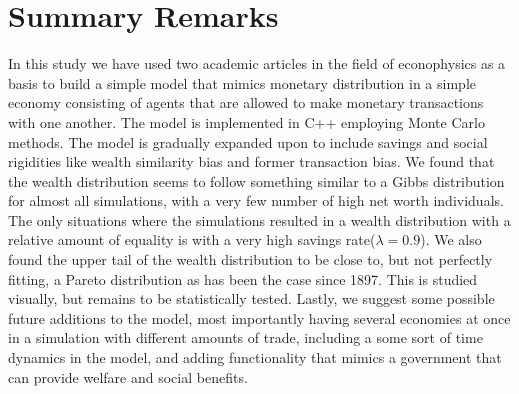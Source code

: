 \documentclass[10pt, a4paper]{amsart}
\begin{document}
\section{Summary Remarks}
In this study we have used two academic articles in the field of econophysics\cite{Patriarca}\cite{GoswamiSen} as a basis to build a simple model that mimics monetary distribution in a simple economy consisting of agents that are allowed to make monetary transactions with one another. The model is implemented in C++ employing Monte Carlo methods. The model is gradually expanded upon to include savings and social rigidities like wealth similarity bias and former transaction bias. We found that the wealth distribution seems to follow something similar to a Gibbs distribution for almost all simulations, with a very few number of high net worth individuals. The only situations where the simulations resulted in a wealth distribution with a relative amount of equality is with a very high savings rate($\lambda=0.9$). We also found the upper tail of the wealth distribution to be close to, but not perfectly fitting, a Pareto distribution as has been the case since 1897\cite{Pareto}. This is studied visually, but remains to be statistically tested. Lastly, we suggest some possible future additions to the model, most importantly having several economies at once in a simulation with different amounts of trade, including a some sort of time dynamics in the model, and adding functionality that mimics a government that can provide welfare and social benefits. 
\end{document}
